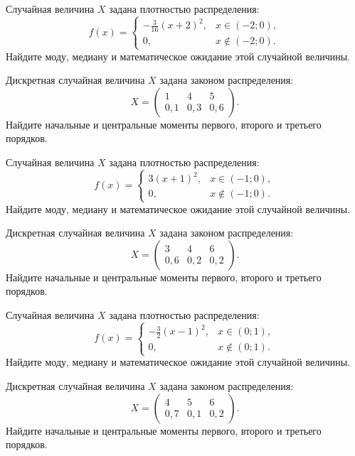 \vfill

\newpage\setcounter{zad}{0}

\z Случайная величина $X$ задана плотностью распределения: $$f(x) = \begin{cases} -\frac{3}{16}(x+2)^2, & x \in (-2; 0), \\ 0, & x \not\in (-2; 0). \end{cases}$$ Найдите моду, медиану и математическое ожидание этой случайной величины.


\vfill

\z Дискретная случайная величина $X$ задана законом распределения: $$ X = \left(\begin{array}{rrr}1 & 4 & 5\\0{,}1 & 0{,}3 & 0{,}6\end{array}\right).$$ Найдите начальные и центральные моменты первого, второго и третьего порядков.
 

\vfill

\newpage\setcounter{zad}{0}

\z Случайная величина $X$ задана плотностью распределения: $$f(x) = \begin{cases} 3(x+1)^2, & x \in (-1; 0), \\ 0, & x \not\in (-1; 0). \end{cases}$$ Найдите моду, медиану и математическое ожидание этой случайной величины.


\vfill

\z Дискретная случайная величина $X$ задана законом распределения: $$ X = \left(\begin{array}{rrr}3 & 4 & 6\\0{,}6 & 0{,}2 & 0{,}2\end{array}\right).$$ Найдите начальные и центральные моменты первого, второго и третьего порядков.
 

\vfill

\newpage\setcounter{zad}{0}

\z Случайная величина $X$ задана плотностью распределения: $$f(x) = \begin{cases} -\frac{3}{2}(x-1)^2, & x \in (0; 1), \\ 0, & x \not\in (0; 1). \end{cases}$$ Найдите моду, медиану и математическое ожидание этой случайной величины.


\vfill

\z Дискретная случайная величина $X$ задана законом распределения: $$ X = \left(\begin{array}{rrr}4 & 5 & 6\\0{,}7 & 0{,}1 & 0{,}2\end{array}\right).$$ Найдите начальные и центральные моменты первого, второго и третьего порядков.
 

